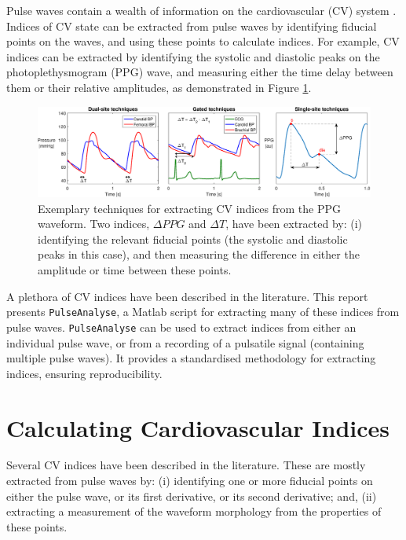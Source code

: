 \documentclass[12pt]{iopart}
\newcommand{\pa}{\texttt{PulseAnalyse}}
\begin{document}
Pulse waves contain a wealth of information on the cardiovascular (CV) system \cite{Elgendi2012,Gallagher}. Indices of CV state can be extracted from pulse waves by identifying fiducial points on the waves, and using these points to calculate indices. For example, CV indices can be extracted by identifying the systolic and diastolic peaks on the photoplethysmogram (PPG) wave, and measuring either the time delay between them or their relative amplitudes, as demonstrated in Figure \ref{fig:si_techniques}.
\begin{figure}[h]
	\centering
	\includegraphics[width=0.4\linewidth, trim={28.1cm 0 0 0.8cm},clip]{./Figures/si_techniques_young.eps}
	\caption{Exemplary techniques for extracting CV indices from the PPG waveform. Two indices, $\Delta PPG$ and $\Delta T$, have been extracted by: (i) identifying the relevant fiducial points (the systolic and diastolic peaks in this case), and then measuring the difference in either the amplitude or time between these points.}
	\label{fig:si_techniques}
\end{figure}
A plethora of CV indices have been described in the literature. This report presents \pa, a Matlab \textregistered{} script for extracting many of these indices from pulse waves. \pa{} can be used to extract indices from either an individual pulse wave, or from a recording of a pulsatile signal (containing multiple pulse waves). It provides a standardised methodology for extracting indices, ensuring reproducibility.

\section{Calculating Cardiovascular Indices}

Several CV indices have been described in the literature. These are mostly extracted from pulse waves by: (i) identifying one or more fiducial points on either the pulse wave, or its first derivative, or its second derivative; and, (ii) extracting a measurement of the waveform morphology from the properties of these points.
\end{document}
